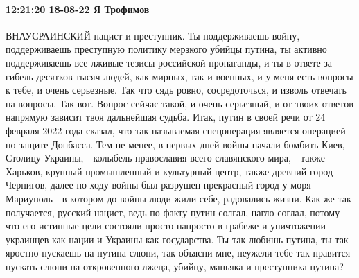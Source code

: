 
 
 
 
 

\paragraph{12:21:20 18-08-22 Я Трофимов}

ВНАУСРАИНСКИЙ нацист и преступник. Ты поддерживаешь войну, поддерживаешь
преступную политику мерзкого убийцы путина, ты активно поддерживаешь все лживые
тезисы российской пропаганды, и ты в ответе за гибель десятков тысяч людей, как
мирных, так и военных, и у меня есть вопросы к тебе, и очень серьезные. Так что
сядь ровно, сосредоточься, и изволь отвечать на вопросы. Так вот. Вопрос сейчас
такой, и очень серьезный, и от твоих ответов напрямую зависит твоя дальнейшая
судьба.  Итак, путин в своей речи от 24 февраля 2022 года сказал, что так
называемая спецоперация является операцией по защите Донбасса. Тем не менее, в
первых дней войны начали бомбить Киев, - Столицу Украины, - колыбель
православия всего славянского мира, - также Харьков, крупный промышленный и
культурный центр, также древний город Чернигов, далее по ходу войны был
разрушен прекрасный город у моря - Мариуполь - в котором до войны люди жили
себе, радовались жизни. Как же так получается, русский нацист, ведь по факту
путин солгал, нагло соглал, потому что его истинные цели состояли просто
напросто в грабеже и уничтожении украинцев как нации и Украины как государства.
Ты так любишь путина, ты так яростно пускаешь на путина слюни, так объясни мне,
неужели тебе так нравится пускать слюни на откровенного лжеца, убийцу, маньяка
и преступника путина?
